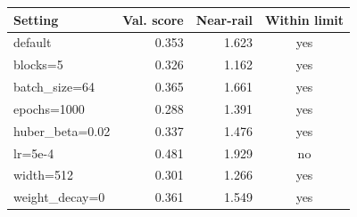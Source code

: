 \begin{tabular}{lrrc}
\toprule
Setting & Val. score & Near-rail & Within limit \\
\midrule
default & 0.353 & 1.623 & yes \\
blocks=5 & 0.326 & 1.162 & yes \\
batch\_size=64 & 0.365 & 1.661 & yes \\
epochs=1000 & 0.288 & 1.391 & yes \\
huber\_beta=0.02 & 0.337 & 1.476 & yes \\
lr=5e-4 & 0.481 & 1.929 & no \\
width=512 & 0.301 & 1.266 & yes \\
weight\_decay=0 & 0.361 & 1.549 & yes \\
\bottomrule
\end{tabular}
